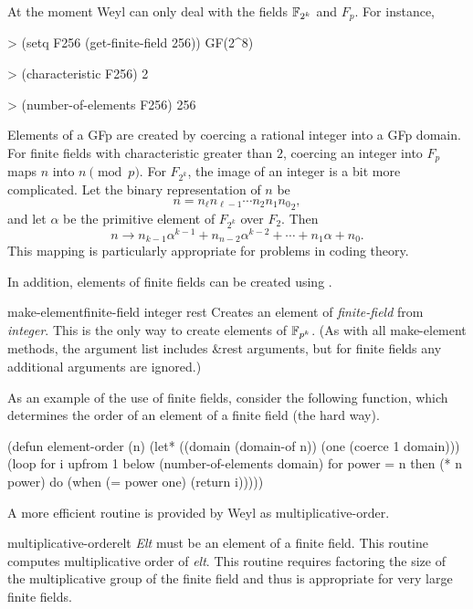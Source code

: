 At the moment Weyl can only deal with the fields ${\Bbb F}_{2^k}$ and $F_p$.
For instance,
\begin{code}
> (setq F256 (get-finite-field 256))
GF(2^8)

> (characteristic F256)
2

> (number-of-elements F256)
256
\end{code}


Elements of a GFp are created by coercing a rational integer into a
GFp domain.  For finite fields with characteristic greater than $2$,
coercing an integer into $F_p$ maps $n$ into $n \pmod p$.  For
$F_{2^k}$, the image of an integer is a bit more complicated.  Let the
binary representation of $n$ be 
\[
n = {n_\ell n_{\ell-1} \cdots n_2 n_1 n_0}_2,
\]
and let $\alpha$ be the primitive element of $F_{2^k}$ over $F_2$.
Then
\[
n \longrightarrow n_{k-1} \alpha^{k-1} + n_{n-2}\alpha^{k-2} + \cdots
 + n_1 \alpha + n_0.
\]
This mapping is particularly appropriate for problems in coding
theory.

In addition, elements of finite fields can be created using
.  

\begin{functiondef}{make-element}{finite-field integer \optional rest}
Creates an element of {\em finite-field} from {\em integer\/}.  This
is the only way to create elements of ${\Bbb F}_{p^k}$.  (As with all {\sf
make-element} methods, the argument list includes \&rest arguments,
but for finite fields any additional arguments are ignored.)
\end{functiondef}

As an example of the use of finite fields, consider the following
function, which determines the order of an element of a finite field
(the hard way).
\begin{code}
(defun element-order (n)
  (let* ((domain (domain-of n))
         (one (coerce 1 domain)))
    (loop for i upfrom 1 below (number-of-elements domain)
          for power = n then (* n power)
     	  do (when (= power one) 
               (return i)))))
\end{code}

A more efficient routine is provided by Weyl as {\sf multiplicative-order}. 

\begin{functiondef}{multiplicative-order}{elt}
{\em Elt} must be an element of a finite field.  This routine computes
multiplicative order of {\em elt}.  This routine requires factoring
the size of the multiplicative group of the finite field and thus is
appropriate for very large finite fields.
\end{functiondef}

